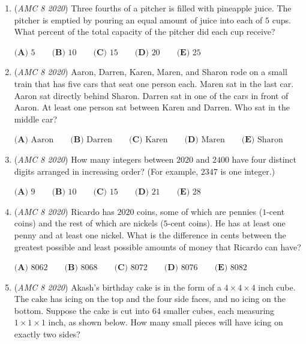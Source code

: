 \begin{enumerate}
	\item (\textit{AMC 8 2020}) Three fourths of a pitcher is filled with pineapple juice. The pitcher is emptied by pouring an equal amount of juice into each of $5$ cups. What percent of the total capacity of the pitcher did each cup receive? 


 $\textbf{(A) }5 \qquad \textbf{(B) }10 \qquad \textbf{(C) }15 \qquad \textbf{(D) }20 \qquad \textbf{(E) }25$


	\item (\textit{AMC 8 2020}) Aaron, Darren, Karen, Maren, and Sharon rode on a small train that has five cars that seat one person each. Maren sat in the last car. Aaron sat directly behind Sharon. Darren sat in one of the cars in front of Aaron. At least one person sat between Karen and Darren. Who sat in the middle car?


 $\textbf{(A) }\text{Aaron} \qquad \textbf{(B) }\text{Darren} \qquad \textbf{(C) }\text{Karen} \qquad \textbf{(D) }\text{Maren}\qquad \textbf{(E) }\text{Sharon}$


	\item (\textit{AMC 8 2020}) How many integers between $2020$ and $2400$ have four distinct digits arranged in increasing order? (For example, $2347$ is one integer.)


 $\textbf{(A) }\text{9} \qquad \textbf{(B) }\text{10} \qquad \textbf{(C) }\text{15} \qquad \textbf{(D) }\text{21}\qquad \textbf{(E) }\text{28}$


	\item (\textit{AMC 8 2020}) Ricardo has $2020$ coins, some of which are pennies ($1$-cent coins) and the rest of which are nickels ($5$-cent coins). He has at least one penny and at least one nickel. What is the difference in cents between the greatest possible and least possible amounts of money that Ricardo can have?


 $\textbf{(A) }\text{8062} \qquad \textbf{(B) }\text{8068} \qquad \textbf{(C) }\text{8072} \qquad \textbf{(D) }\text{8076}\qquad \textbf{(E) }\text{8082}$


	\item (\textit{AMC 8 2020}) Akash's birthday cake is in the form of a $4 \times 4 \times 4$ inch cube. The cake has icing on the top and the four side faces, and no icing on the bottom. Suppose the cake is cut into $64$ smaller cubes, each measuring $1 \times 1 \times 1$ inch, as shown below. How many small pieces will have icing on exactly two sides?



\end{enumerate}
